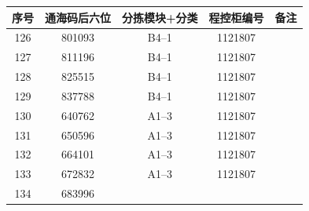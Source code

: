 \documentclass[UTF8,10pt,a4paper,fontset=fandol]{ctexart}
\newcommand{\fieldvalue}[1]{#1}
\begin{document}
\begin{center}
\small
\begin{tabular}{|c|c|c|c|p{3.5cm}|}
\hline
序号 & 通海码后六位 & 分拣模块+分类 & 程控柜编号 & 备注 \\ \hline
126 &
\fieldvalue{801093} &
\fieldvalue{B4--1} &
\fieldvalue{1121807} & \\ \hline
127 &
\fieldvalue{811196} &
\fieldvalue{B4--1} &
\fieldvalue{1121807} & \\ \hline
128 &
\fieldvalue{825515} &
\fieldvalue{B4--1} &
\fieldvalue{1121807} & \\ \hline
129 &
\fieldvalue{837788} &
\fieldvalue{B4--1} &
\fieldvalue{1121807} & \\ \hline
130 &
\fieldvalue{640762} &
\fieldvalue{A1--3} &
\fieldvalue{1121807} & \\ \hline
131 &
\fieldvalue{650596} &
\fieldvalue{A1--3} &
\fieldvalue{1121807} & \\ \hline
132 &
\fieldvalue{664101} &
\fieldvalue{A1--3} &
\fieldvalue{1121807} & \\ \hline
133 &
\fieldvalue{672832} &
\fieldvalue{A1--3} &
\fieldvalue{1121807} & \\ \hline
134 &
\fieldvalue{683996} &

\end{tabular}
\end{center}
\end{document}

